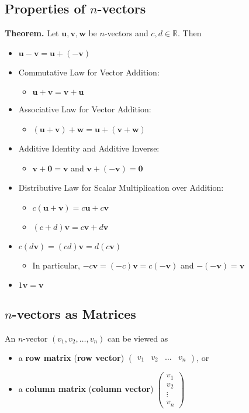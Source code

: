 \documentclass[../ma2001_notes.tex]{subfiles}
\begin{document}
\subsection{Properties of $n$-vectors}
\textbf{Theorem.} Let \(\bm{u},\bm{v},\bm{w}\) be \(n\)-vectors and \(c,d\in\mathbb{R}\). Then
\begin{itemize}
	\item\(\bm{u}-\bm{v}=\bm{u}+(-\bm{v})\)
	\item Commutative Law for Vector Addition:
	\begin{itemize}
		\item\(\bm{u}+\bm{v}=\bm{v}+\bm{u}\)
	\end{itemize}
	\item Associative Law for Vector Addition:
	\begin{itemize}
		\item\((\bm{u}+\bm{v})+\bm{w}=\bm{u}+(\bm{v}+\bm{w})\)
	\end{itemize}
	\item Additive Identity and Additive Inverse:
	\begin{itemize}
		\item\(\bm{v}+\bm{0}=\bm{v}\) and \(\bm{v}+(-\bm{v})=\bm{0}\)
	\end{itemize}
	\item Distributive Law for Scalar Multiplication over Addition:
	\begin{itemize}
		\item\(c(\bm{u}+\bm{v})=c\bm{u}+c\bm{v}\)
		\item\((c+d)\bm{v}=c\bm{v}+d\bm{v}\)
	\end{itemize}
	\item\(c(d\bm{v})=(cd)\bm{v}=d(c\bm{v})\)
	\begin{itemize}
		\item In particular, \(-c\bm{v}=(-c)\bm{v}=c(-\bm{v})\) and \(-(-\bm{v})=\bm{v}\)
	\end{itemize}
	\item\(1\bm{v}=\bm{v}\)
\end{itemize}

\subsection{$n$-vectors as Matrices}
An \(n\)-vector \((v_1,v_2,\ldots,v_n)\) can be viewed as
\begin{itemize}
	\item a \textbf{row matrix} (\textbf{row vector}) \(\begin{pmatrix}
		v_1 & v_2 & \ldots & v_n
	\end{pmatrix}\), or
	\item a \textbf{column matrix} (\textbf{column vector}) \(\begin{pmatrix}
		v_1 \\ v_2 \\ \vdots \\ v_n
	\end{pmatrix}\)
\end{itemize}
\end{document}
